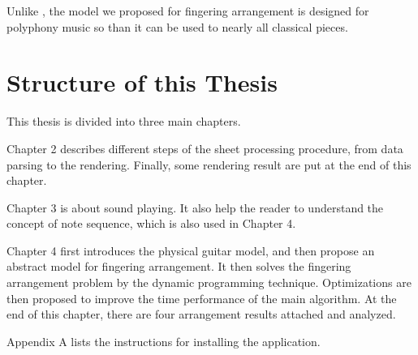 Unlike \citep{constructing-system}, the model we proposed for fingering arrangement is designed for polyphony music so than it can be used to nearly all classical pieces.


\section{Structure of this Thesis}
This thesis is divided into three main chapters.

Chapter 2 describes different steps of the sheet processing procedure, from data parsing to the rendering. Finally, some rendering result are put at the end of this chapter.

Chapter 3 is about sound playing. It also help the reader to understand the concept of note sequence, which is also used in Chapter 4.

Chapter 4 first introduces the physical guitar model, and then propose an abstract model for fingering arrangement. It then solves the fingering arrangement problem by the dynamic programming technique. Optimizations are then proposed to improve the time performance of the main algorithm. At the end of this chapter, there are four arrangement results attached and analyzed.

Appendix A lists the instructions for installing the application.
